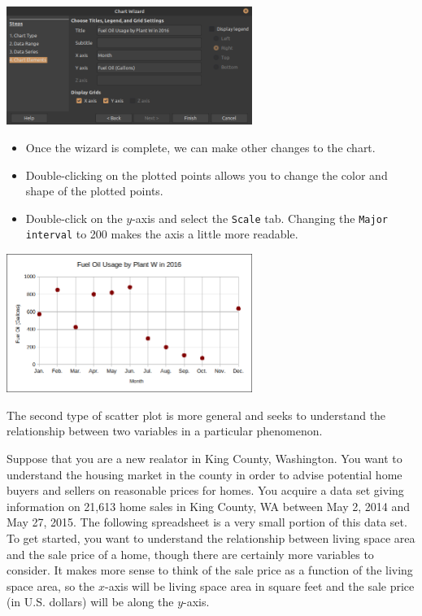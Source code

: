    \begin{center}
    \includegraphics[width = 0.6\textwidth]{img/chap1/sec1-3/scatterplot3-oil.png}
    \end{center}
    \begin{itemize}
      \item Once the wizard is complete, we can make other changes to the chart.
      \item Double-clicking on the plotted points allows you to change the color and shape of the plotted points.
      \item Double-click on the $y$-axis and select the {\tt Scale} tab. Changing the {\tt Major interval} to 200 makes the axis a little more readable.
    \end{itemize}
    \begin{center}
    \includegraphics[width = 0.6\textwidth]{img/chap1/sec1-3/scatterplot4-oil.png}
    \end{center}

The second type of scatter plot is more general and seeks to understand the relationship between two variables in a particular phenomenon.

Suppose that you are a new realator in King County, Washington. You want to understand the housing market in the county in order to advise potential home buyers and sellers on reasonable prices for homes. You acquire a data set giving information on 21,613 home sales in King County, WA between May 2, 2014 and May 27, 2015. The following spreadsheet is a very small portion of this data set. To get started, you want to understand the relationship between living space area and the sale price of a home, though there are certainly more variables to consider. It makes more sense to think of the sale price as a function of the living space area, so the $x$-axis will be living space area in square feet and the sale price (in U.S. dollars) will be along the $y$-axis.

